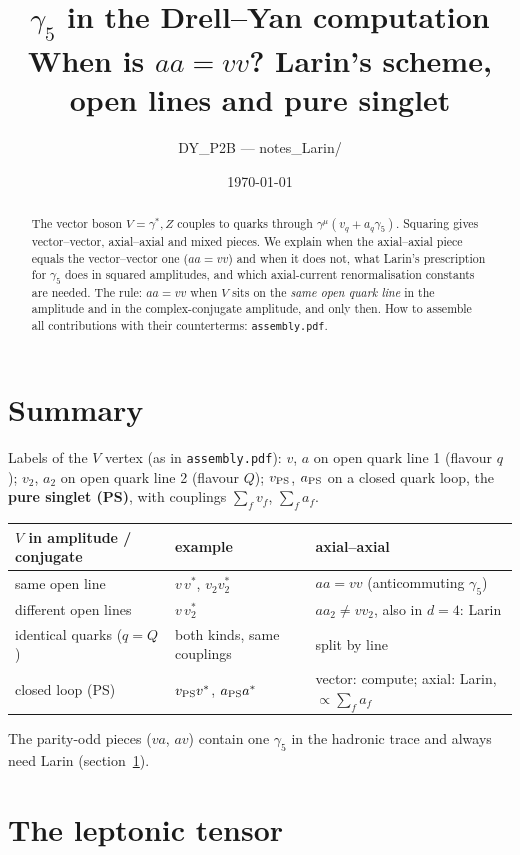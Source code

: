 \documentclass[11pt,a4paper]{article}
\title{$\gamma_5$ in the Drell--Yan computation\\[2pt]
\large When is $aa=vv$? Larin's scheme, open lines and pure singlet}
\author{DY\_P2B --- notes\_Larin/}
\date{\today}
\newcommand{\gf}{\gamma_5}
\newcommand{\PS}{_{\rm PS}}
\begin{document}
\maketitle

\begin{abstract}
The vector boson $V=\gamma^*,Z$ couples to quarks through $\gamma^\mu(v_q+a_q\gf)$. Squaring gives vector--vector,
axial--axial and mixed pieces. We explain when the axial--axial piece equals the vector--vector one ($aa=vv$) and
when it does not, what Larin's prescription for $\gf$ does in squared amplitudes, and which axial-current
renormalisation constants are needed. The rule: $aa=vv$ when $V$ sits on the \emph{same open quark line} in the
amplitude and in the complex-conjugate amplitude, and only then. How to assemble all contributions with their
counterterms: \texttt{assembly.pdf}.
\end{abstract}

\section*{Summary}
\noindent Labels of the $V$ vertex (as in \texttt{assembly.pdf}): $v$, $a$ on open quark line 1 (flavour $q$); $v_2$,
$a_2$ on open quark line 2 (flavour $Q$); $v\PS$, $a\PS$ on a closed quark loop, the \textbf{pure singlet (PS)}, with
couplings $\sum_fv_f$, $\sum_fa_f$.
\begin{center}
\small
\begin{tabular}{lll}
\toprule
$V$ in amplitude / conjugate & example & axial--axial \\
\midrule
same open line & $v\,v^*$, $v_2v_2^*$ & $aa=vv$ (anticommuting $\gf$) \\
different open lines & $v\,v_2^*$ & $aa_2\neq vv_2$, also in $d=4$: Larin \\
identical quarks ($q=Q$) & both kinds, same couplings & split by line \\
closed loop (PS) & $v\PS v^*$, $a\PS a^*$ & vector: compute; axial: Larin, $\propto\sum_fa_f$ \\
\bottomrule
\end{tabular}
\end{center}
The parity-odd pieces ($va$, $av$) contain one $\gf$ in the hadronic trace and always need Larin
(section~\ref{sec:lept}).

\section{The leptonic tensor}\label{sec:lept}
\end{document}

